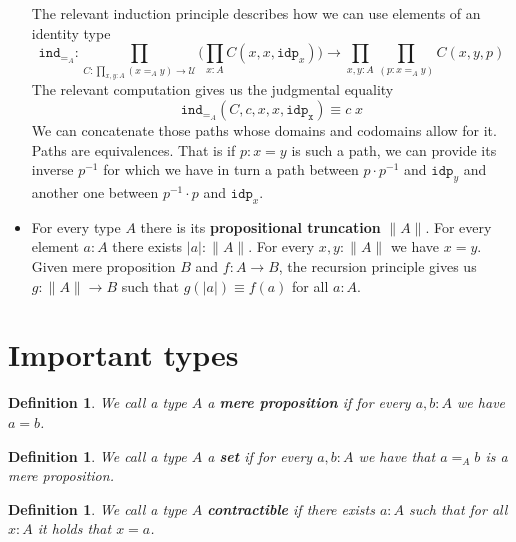 \documentclass[12pt]{report}
\newtheorem{defn}[thm]{Definition}
\begin{document}
\begin{itemize}
	The relevant induction principle describes how we can use elements of an identity type
	$$\mathtt{ind}_{=_{A}} : \prod_{C : \prod_{x,y : A} (x =_A y) \rightarrow \mathcal{U}} \Big( \prod_{x : A}C(x,x,\mathtt{idp}_x) \Big) \rightarrow \prod_{x,y : A} \prod_{(p : x =_A y)} C(x,y,p)$$
	The relevant computation gives us the judgmental equality 
	$$\mathtt{ind}_{=_A} (C,c,x,x,\mathtt{idp_x}) \equiv c\; x$$
	We can concatenate those paths whose domains and codomains allow for it. 
	Paths are equivalences. That is if $p : x = y$ is such a  path, we can provide its inverse $p^{-1}$ for which we have in turn a path between $p\cdot p^{-1}$ and $\mathtt{idp}_y$ and another one between $p^{-1}\cdot p$ and $\mathtt{idp}_x$. 
	\item For every type $A$ there is its \textbf{propositional truncation} $\| A \|$. 
	For every element $a : A$ there exists $|a| : \| A\|$. 
	For every $x, y : \| A\|$ we have $x = y$. 
	Given mere proposition $B$ and $f : A \rightarrow B$, the recursion principle gives us $g : \|A\| \rightarrow B$ such that $g(|a|) \equiv f(a)$ for all $a : A$.


\end{itemize}

\section{Important types}
\begin{defn}
We call a type $A$ a \textbf{mere proposition} if for every $a,b : A$ we have $a = b$.
\end{defn}

\begin{defn}
We call a type $A$ a \textbf{set} if for every $a,b : A$ we have that $a =_A b$ is a mere proposition.
\end{defn}

\begin{defn}
We call a type $A$ \textbf{contractible} if there exists $a : A$ such that for all $x : A$ it holds that $x = a$.
\end{defn}
\end{document}
